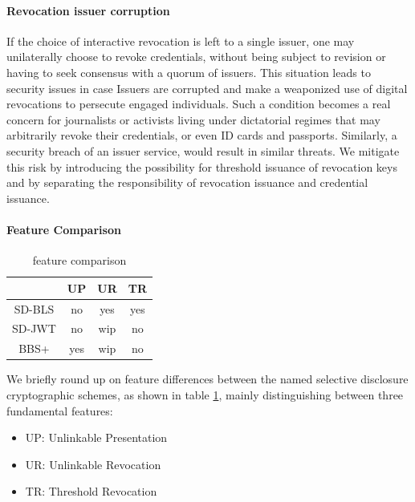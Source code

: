 

\paragraph{Revocation issuer corruption}

If the choice of interactive revocation is left to a single issuer, one may unilaterally choose to revoke credentials, without being subject to revision or having to seek consensus with a quorum of issuers. This situation leads to security issues in case Issuers are corrupted and make a weaponized use of digital revocations to persecute engaged individuals. Such a condition becomes a real concern for journalists or activists living under dictatorial regimes that may arbitrarily revoke their credentials, or even ID cards and passports. Similarly, a security breach of an issuer service, would result in similar threats. We mitigate this risk by introducing the possibility for threshold issuance of revocation keys and by separating the responsibility of revocation issuance and credential issuance.

\paragraph{Feature Comparison}

\begin{table}[]
\centering
\begin{tabular}{cccc}
\hline
       & \textbf{UP} & \textbf{UR} & \textbf{TR} \\ \hline
SD-BLS & no          & yes         & yes         \\ \hline
SD-JWT & no          & wip         & no          \\ \hline
BBS+   & yes         & wip         & no          \\ \hline
\end{tabular}
\caption{feature comparison}
\label{tab:features}
\end{table}

We briefly round up on feature differences between the named selective disclosure cryptographic schemes, as shown in table \ref{tab:features}, mainly distinguishing between three fundamental features:
\begin{itemize}
\item UP: Unlinkable Presentation
\item UR: Unlinkable Revocation
\item TR: Threshold Revocation
\end{itemize}

